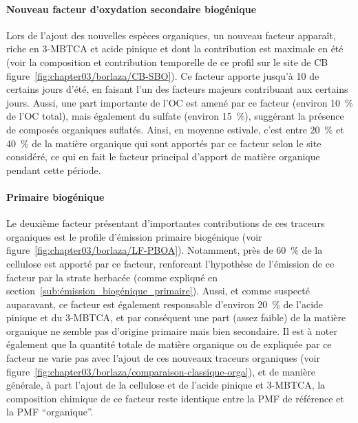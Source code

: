 \paragraph{Nouveau facteur d'oxydation secondaire biogénique}%
\label{par:nouveau_facteur_d_oxydation_secondaire_biogénique}

Lors de l'ajout des nouvelles espèces organiques, un nouveau facteur apparaît, riche en
3-MBTCA et acide pinique et dont la contribution est maximale en été (voir la composition
et contribution temporelle de ce profil sur le site de CB
figure~\ref{fig:chapter03/borlaza/CB-SBO}).  Ce facteur apporte jusqu'à \SI{10}{\ugm} de
\PMdix{} certains jours d'été, en faisant l'un des facteurs majeurs contribuant aux
\PMdix{} certains jours.  Aussi, une part importante de l'OC est amené par ce facteur
(environ \SI{10}{\percent} de l'OC total), mais également du sulfate (environ
\SI{15}{\percent}), suggérant la présence de composés organiques suflatés.  Ainsi, en
moyenne estivale, c'est entre \SI{20}{\percent} et \SI{40}{\percent} de la matière
organique qui sont apportés par ce facteur selon le site considéré, ce qui en fait le
facteur principal d'apport de matière organique pendant cette période.

\paragraph{Primaire biogénique}%
\label{par:primaire_biogénique}

Le deuxième facteur présentant d'importantes contributions de ces traceurs organiques est
le profile d'émission primaire biogénique (voir
figure~\ref{fig:chapter03/borlaza/LF-PBOA}). Notamment, près de \SI{60}{\percent} de la
cellulose est apporté par ce facteur, renforcant l'hypothèse de l'émission de ce facteur
par la strate herbacée (comme expliqué en
section~\ref{sub:émission_biogénique_primaire}). Aussi, et comme suspecté auparavant, ce
facteur est également responsable d'environ \SI{20}{\percent} de l'acide pinique et du
3-MBTCA, et par conséquent une part (assez faible) de la matière organique ne semble pas
d'origine primaire mais bien secondaire. Il est à noter également que la quantité totale
de matière organique ou de \PMdix{} expliquée par ce facteur ne varie pas avec l'ajout de
ces nouveaux traceurs organiques (voir
figure~\ref{fig:chapter03/borlaza/comparaison-classique-orga}), et de manière générale, à
part l'ajout de la cellulose et de l'acide pinique et 3-MBTCA, la composition chimique de
ce facteur reste identique entre la PMF de référence et la PMF ``organique''.

